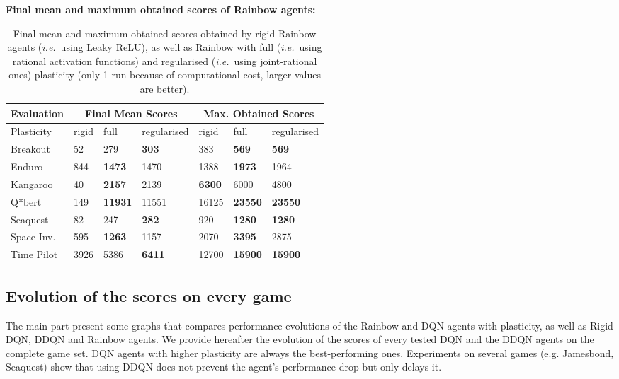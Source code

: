 \documentclass[accepted]{article}
\theoremstyle{plain}
\theoremstyle{definition}
\theoremstyle{remark}
\newcommand{\ie}{\emph{i.e.}~}
\begin{document}
\newpage
\textbf{Final mean and maximum obtained scores of Rainbow agents:}
\begin{table}[H]
\centering
\begin{tabular}{@{}lllllll@{}}
\toprule
Evaluation                         & \multicolumn{3}{c}{\textbf{Final Mean Scores}}                          & \multicolumn{3}{c}{Max. Obtained Scores}      \\ \midrule
\multicolumn{1}{l|}{Plasticity}    & rigid & full  & \multicolumn{1}{l|}{regularised} & rigid & full  & regularised \\ \midrule
\multicolumn{1}{l|}{Breakout}      & 52     & 279   & \multicolumn{1}{l|}{\textbf{303}}         & 383    & \textbf{569}   & \textbf{569}         \\
\multicolumn{1}{l|}{Enduro}        & 844    & \textbf{1473}  & \multicolumn{1}{l|}{1470}        & 1388   & \textbf{1973}  & 1964        \\
\multicolumn{1}{l|}{Kangaroo}         & 40    & \textbf{2157} & \multicolumn{1}{l|}{2139}  & \textbf{6300}  & 6000 & 4800   \\
\multicolumn{1}{l|}{Q*bert}         & 149    & \textbf{11931} & \multicolumn{1}{l|}{11551}       & 16125  & \textbf{23550} & \textbf{23550}       \\
\multicolumn{1}{l|}{Seaquest}      & 82     & 247   & \multicolumn{1}{l|}{\textbf{282}}         & 920    & \textbf{1280}  & \textbf{1280}        \\
\multicolumn{1}{l|}{Space Inv.} & 595    & \textbf{1263}  & \multicolumn{1}{l|}{1157}        & 2070   & \textbf{3395}  & 2875        \\
\multicolumn{1}{l|}{Time Pilot}     & 3926   & 5386  & \multicolumn{1}{l|}{\textbf{6411}}        & 12700  & \textbf{15900} & \textbf{15900}       \\ \bottomrule
\end{tabular}
\caption{Final mean and maximum obtained scores obtained by rigid Rainbow agents (\ie using Leaky ReLU), as well as Rainbow with full (\ie using rational activation functions) and regularised (\ie using joint-rational ones) plasticity (only 1 run because of computational cost, larger values are better).}
\end{table}

\newpage
\subsection{Evolution of the scores on every game}
\label{app:score_evo_complete}
The main part present some graphs that compares performance evolutions of the Rainbow and DQN agents with plasticity, as well as Rigid DQN, DDQN and Rainbow agents. We provide hereafter the evolution of the scores of every tested DQN and the DDQN agents on the complete game set. DQN agents with higher plasticity are always the best-performing ones. Experiments on several games (e.g. Jamesbond, Seaquest) show that using DDQN does not prevent the agent's performance drop but only delays it. 
\end{document}
